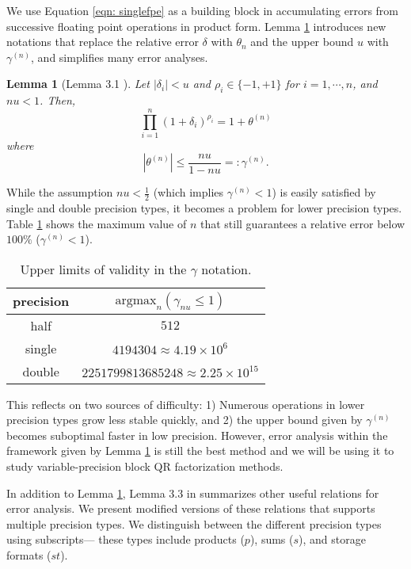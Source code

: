 \documentclass{article}
\newtheorem{lemma}[theorem]{Lemma}
\newcommand{\dd}{\delta}
\newcommand{\tth}{\theta}
\theoremstyle{definition}
\begin{document}
We use Equation \ref{eqn: singlefpe} as a building block in accumulating errors from successive floating point operations in product form.
Lemma \ref{lem:gamma} introduces new notations that replace the relative error $\dd$ with $\theta_n$ and the upper bound $u$ with $\gamma^{(n)}$, and simplifies many error analyses. 
\begin{lemma}[Lemma 3.1 \cite{Higham2002}]
\label{lem:gamma}
    Let $|\dd_i|<u$ and $\rho_i \in\{-1, +1\}$ for $i = 1 , \cdots, n$, and $nu < 1$. Then, 
    \begin{equation}
        \prod_{i=1}^n (1+\dd_i)^{\rho_i} = 1 + \tth^{(n)}
    \end{equation}
    where
    \begin{equation}
        |\tth^{(n)}|\leq \frac{nu}{1-nu}=:\gamma^{(n)}.
    \end{equation}
\end{lemma}
While the assumption $nu<\frac{1}{2}$ (which implies $\gamma^{(n)} < 1$) is easily satisfied by single and double precision types, it becomes a problem for lower precision types.
Table \ref{table:ieeen} shows the maximum value of $n$ that still guarantees a relative error below $100\%$ ($\gamma^{(n)} < 1$). 
\begin{table}[h]
	\centering
	\begin{tabular}{||c|c||} 
		\hline
		precision & $\mathrm{argmax}_n(\gamma_{nu} \leq 1)$ \\ \hline
		half & $512$\\
		single & $4194304\approx 4.19\times 10^6$ \\
		double & $2251799813685248 \approx 2.25\times 10^{15}$ \\ \hline
	\end{tabular}
	\caption{Upper limits of validity in the $\gamma$ notation.}
	\label{table:ieeen}
\end{table}
This reflects on two sources of difficulty: 1) Numerous operations in lower precision types grow less stable quickly, and 2) the upper bound given by $\gamma^{(n)}$ becomes suboptimal faster in low precision.
However, error analysis within the framework given by Lemma \ref{lem:gamma} is still the best method and we will be using it to study variable-precision block QR factorization methods. \par 

In addition to Lemma \ref{lem:gamma}, Lemma 3.3 in \citep{Higham2002} summarizes other useful relations for error analysis.
We present modified versions of these relations that supports multiple precision types.
We distinguish between the different precision types using subscripts--- these types include products ($p$), sums ($s$), and storage formats ($st$).
\end{document}
